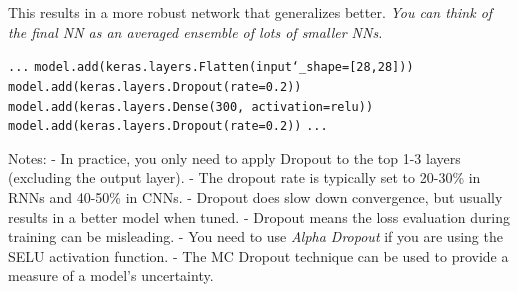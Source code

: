 This results in a more robust network that generalizes better.\newline
\textit{You can think of the final NN as an averaged ensemble of lots of smaller NNs.}

\texttt{...}\newline
\texttt{model.add(keras.layers.Flatten(input\char`_shape=[28,28]))}\newline
\texttt{model.add(keras.layers.Dropout(rate=0.2))}\newline
\texttt{model.add(keras.layers.Dense(300, activation=\textquotesingle relu\textquotesingle))}\newline
\texttt{model.add(keras.layers.Dropout(rate=0.2))}\newline
\texttt{...}\newline

Notes:\newline
- In practice, you only need to apply Dropout to the top 1-3 layers (excluding the output layer).\newline
- The dropout rate is typically set to 20-30\% in RNNs and 40-50\% in CNNs.\newline
- Dropout does slow down convergence, but usually results in a better model when tuned.\newline
- Dropout means the loss evaluation during training can be misleading.\newline
- You need to use \textit{Alpha Dropout} if you are using the SELU activation function.\newline
- The MC Dropout technique can be used to provide a measure of a model's uncertainty.

\newpage




